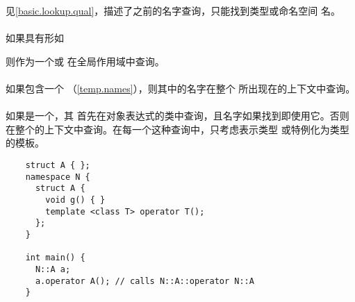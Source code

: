 \begin{note}
  见\ref{basic.lookup.qual}，描述了\tm{::}之前的名字查询，只能找到类型或命名空间
  名。
\end{note}

\paragraph{} %
如果具有形如\par
\qquad{} \par
则作为一个或
在全局作用域中查询。

\paragraph{} %
如果包含一个
（\ref{temp.names}），则其中的名字在整个
所出现在的上下文中查询。

\paragraph{} %
如果是一个，其
首先在对象表达式的类中查询，且名字如果找到即使用它。否则
在整个的上下文中查询。在每一个这种查询中，只考虑表示类型
或特例化为类型的模板。

\begin{example}
  \begin{lstlisting}
    struct A { };
    namespace N {
      struct A {
        void g() { }
        template <class T> operator T();
      };
    }

    int main() {
      N::A a;
      a.operator A(); // calls N::A::operator N::A
    }
  \end{lstlisting}
\end{example}
